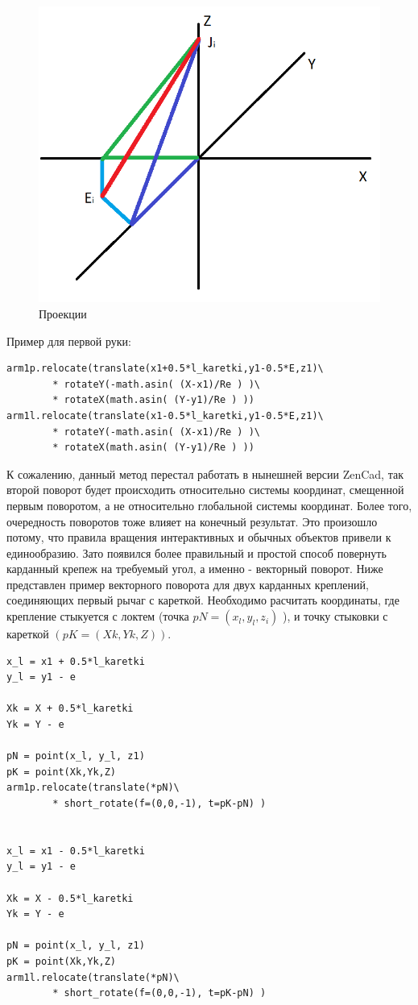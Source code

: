 \begin{figure}[h]
\centering
\includegraphics[width=0.6\linewidth]{./image/proection}
\caption{Проекции}
\end{figure}

Пример для первой руки:

\begin{lstlisting}[style=python,caption=Тригонометрический способ ориентирования шарниров]
arm1p.relocate(translate(x1+0.5*l_karetki,y1-0.5*E,z1)\
        * rotateY(-math.asin( (X-x1)/Re ) )\
        * rotateX(math.asin( (Y-y1)/Re ) ))
arm1l.relocate(translate(x1-0.5*l_karetki,y1-0.5*E,z1)\
        * rotateY(-math.asin( (X-x1)/Re ) )\
        * rotateX(math.asin( (Y-y1)/Re ) ))
\end{lstlisting}

К сожалению, данный метод перестал работать в нынешней версии ZenCad, так второй поворот будет происходить относительно системы координат, смещенной первым поворотом, а не относительно глобальной системы координат. Более того, очередность поворотов тоже влияет на конечный результат. Это произошло потому, что правила вращения интерактивных и обычных объектов привели к единообразию. Зато появился более правильный и простой способ повернуть карданный крепеж на требуемый угол, а именно - векторный поворот.
Ниже представлен пример векторного поворота для двух карданных креплений, соединяющих первый рычаг с кареткой. Необходимо расчитать координаты, где крепление стыкуется с локтем (точка $pN = (x_l, y_l, z_{i})$ ), и точку стыковки с кареткой $(pK = (Xk, Yk, Z))$. 

\begin{lstlisting}[style=python,caption=Векторный поворот первого шарнира]
x_l = x1 + 0.5*l_karetki
y_l = y1 - e

Xk = X + 0.5*l_karetki
Yk = Y - e

pN = point(x_l, y_l, z1)
pK = point(Xk,Yk,Z)
arm1p.relocate(translate(*pN)\
        * short_rotate(f=(0,0,-1), t=pK-pN) )


x_l = x1 - 0.5*l_karetki
y_l = y1 - e

Xk = X - 0.5*l_karetki
Yk = Y - e

pN = point(x_l, y_l, z1)
pK = point(Xk,Yk,Z)
arm1l.relocate(translate(*pN)\
        * short_rotate(f=(0,0,-1), t=pK-pN) )

\end{lstlisting}

